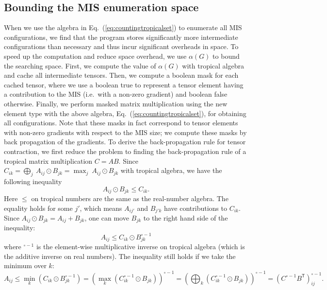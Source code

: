 \documentclass[onefignum, onetabnum]{siamart190516}
\newcommand{\<}{\langle}
\renewcommand{\>}{\rangle}
\newcommand{\Eq}[1]{Eq.~(\ref{#1})}
\begin{document}
\subsection{Bounding the MIS enumeration space}
When we use the algebra in \Eq{eq:countingtropicalset} to enumerate all MIS configurations, we find that the program stores significantly more intermediate configurations than necessary and thus incur significant overheads in space.
To speed up the computation and reduce space overhead, we use $\alpha(G)$ to bound the searching space.
First, we compute the value of $\alpha(G)$ with tropical algebra and cache all intermediate tensors.
Then, we compute a boolean mask for each cached tensor, where we use a boolean true to represent a tensor element having a contribution to the MIS (i.e.\ with a non-zero gradient) and boolean false otherwise.
Finally, we perform masked matrix multiplication using the new element type with the above algebra, \Eq{eq:countingtropicalset}, for obtaining all configurations.
Note that these masks in fact correspond to tensor elements with non-zero gradients with respect to the MIS size; we compute these masks by back propagation of the gradients.
To derive the back-propagation rule for tensor contraction,
we first reduce the problem to finding the back-propagation rule of a tropical matrix multiplication $C = A B$.
Since $ C_{ik} = \bigoplus_{j} \ A_{ij} \odot B_{jk} = \max_{j} \ A_{ij} \odot B_{jk}$ with tropical algebra, we have the following inequality
\begin{equation}
    A_{ij} \odot B_{jk} \leq C_{ik}.
\end{equation}
Here $\leq$ on tropical numbers are the same as the real-number algebra.
The equality holds for some $j'$, which means $A_{ij'}$ and $B_{j'k}$ have contributions to $C_{ik}$.
Since $A_{ij} \odot B_{jk} = A_{ij} + B_{jk}$, one can move $B_{jk}$ to the right hand side of the inequality: 
\begin{equation}
    A_{ij} \leq C_{ik} \odot B_{jk}^{\circ -1}
\end{equation}
where ${}^{\circ -1}$ is the element-wise multiplicative inverse on tropical algebra (which is the additive inverse on real numbers).
The inequality still holds if we take the minimum over $k$: 
\begin{equation}
    A_{ij} \leq \min_{k}(C_{ik} \odot B_{jk}^{\circ -1}) = \left(\max_{k} \left(C_{ik}^{\circ -1} \odot B_{jk} \right) \right)^{\circ -1} = \left(\bigoplus_{k} \left(C_{ik}^{\circ -1} \odot B_{jk} \right) \right)^{\circ -1} = \left( C^{\circ-1} B^{\mathsf{T}} \right)^{\circ -1}_{ij}.
\end{equation}
\end{document}
